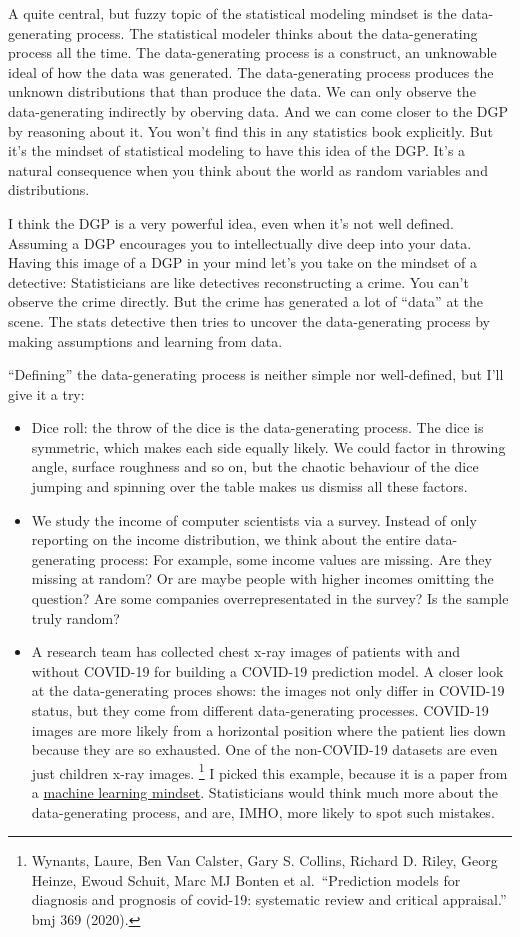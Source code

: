\documentclass[
  10pt,
]{scrbook}
\providecommand{\tightlist}{%
  \setlength{\itemsep}{0pt}\setlength{\parskip}{0pt}}
\begin{document}
A quite central, but fuzzy topic of the statistical modeling mindset is the data-generating process.
The statistical modeler thinks about the data-generating process all the time.
The data-generating process is a construct, an unknowable ideal of how the data was generated.
The data-generating process produces the unknown distributions that than produce the data.
We can only observe the data-generating indirectly by oberving data.
And we can come closer to the DGP by reasoning about it.
You won't find this in any statistics book explicitly.
But it's the mindset of statistical modeling to have this idea of the DGP.
It's a natural consequence when you think about the world as random variables and distributions.

I think the DGP is a very powerful idea, even when it's not well defined.
Assuming a DGP encourages you to intellectually dive deep into your data.
Having this image of a DGP in your mind let's you take on the mindset of a detective:
Statisticians are like detectives reconstructing a crime.
You can't observe the crime directly.
But the crime has generated a lot of ``data'' at the scene.
The stats detective then tries to uncover the data-generating process by making assumptions and learning from data.

``Defining'' the data-generating process is neither simple nor well-defined, but I'll give it a try:

\begin{itemize}
\tightlist
\item
  Dice roll: the throw of the dice is the data-generating process. The dice is symmetric, which makes each side equally likely. We could factor in throwing angle, surface roughness and so on, but the chaotic behaviour of the dice jumping and spinning over the table makes us dismiss all these factors.
\item
  We study the income of computer scientists via a survey. Instead of only reporting on the income distribution, we think about the entire data-generating process: For example, some income values are missing. Are they missing at random? Or are maybe people with higher incomes omitting the question? Are some companies overrepresentated in the survey? Is the sample truly random?
\item
  A research team has collected chest x-ray images of patients with and without COVID-19 for building a COVID-19 prediction model. A closer look at the data-generating proces shows: the images not only differ in COVID-19 status, but they come from different data-generating processes. COVID-19 images are more likely from a horizontal position where the patient lies down because they are so exhausted. One of the non-COVID-19 datasets are even just children x-ray images. \footnote{Wynants, Laure, Ben Van Calster, Gary S. Collins, Richard D. Riley, Georg Heinze, Ewoud Schuit, Marc MJ Bonten et al.~``Prediction models for diagnosis and prognosis of covid-19: systematic review and critical appraisal.'' bmj 369 (2020).} I picked this example, because it is a paper from a \protect\hyperlink{machine-learning}{machine learning mindset}. Statisticians would think much more about the data-generating process, and are, IMHO, more likely to spot such mistakes.
\end{itemize}
\end{document}

